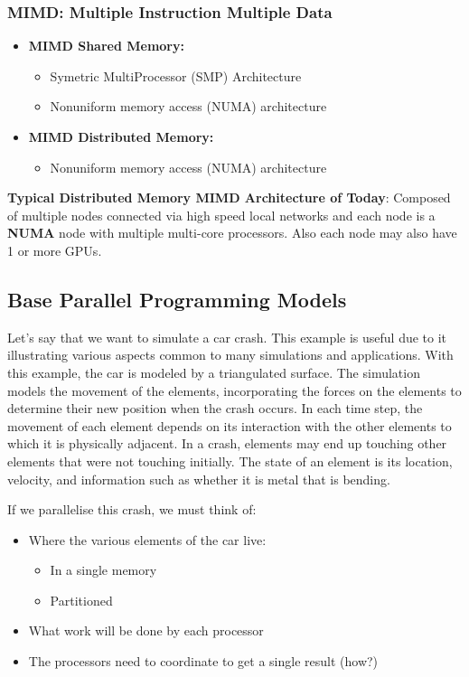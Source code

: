 \subsubsection{MIMD: Multiple Instruction Multiple Data}
\clearpage
\begin{itemize}
    \item \textbf{MIMD Shared Memory:}
    \begin{itemize}
        \item Symetric MultiProcessor (SMP) Architecture
        \item Nonuniform memory access (NUMA) architecture
    \end{itemize}
    \item \textbf{MIMD Distributed Memory:}
    \begin{itemize}
        \item Nonuniform memory access (NUMA) architecture
    \end{itemize}
\end{itemize}
\par \textbf{Typical Distributed Memory MIMD Architecture of Today}: Composed of multiple nodes connected via high speed local networks and each node is a \textbf{NUMA} node with multiple multi-core processors. Also each node may also have 1 or more GPUs.
\clearpage
\subsection{Base Parallel Programming Models}
\par Let's say that we want to simulate a car crash. This example is useful due to it illustrating various aspects common to many simulations and applications. With this example, the car is modeled by a triangulated surface. The simulation models the movement of the elements, incorporating the forces on the elements to determine their new position when the crash occurs. In each time step, the movement of each element depends on its interaction with the other elements to which it is physically adjacent. In a crash, elements may end up touching other elements that were not touching initially. The state of an element is its location, velocity, and information such as whether it is metal that is bending.
\par If we parallelise this crash, we must think of:
\begin{itemize}
    \item Where the various elements of the car live:
    \begin{itemize}
        \item In a single memory
        \item Partitioned
    \end{itemize}
    \item What work will be done by each processor
    \item The processors need to coordinate to get a single result (how?)
\end{itemize}
